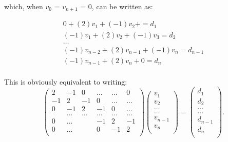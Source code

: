 \documentclass[norsk,a4paper,12pt]{article}
\begin{document}
which, when $v_0$ = $v_{n+1}$ = 0, can be written as:

\begin{equation}
\begin{split}
0 + (2) v_{1} + (-1) v_{2} + = d_1 \\
(-1) v_{1} + (2) v_{2} + (-1) v_{3} = d_2 \\
\dots \\
(-1) v_{n-2} + (2) v_{n-1} + (-1) v_{n} = d_{n-1} \\
(-1) v_{n-1} + (2) v_{n} + 0 = d_{n} \\
\end{split}
\end{equation}
	
This is obviously equivalent to writing:
\begin{equation}
    				\left(\begin{array}{cccccc}
                           2& -1& 0 &\dots   & \dots &0 \\
                           -1 & 2 & -1 &0 &\dots &\dots \\
                           0&-1 &2 & -1 & 0 & \dots \\
                           & \dots   & \dots &\dots   &\dots & \dots \\
                           0&\dots   &  &-1 &2& -1 \\
                           0&\dots    &  & 0  &-1 & 2 \\
                      \end{array} \right)\left(\begin{array}{c}
                           v_1\\
                           v_2\\
                           \dots \\
                           \dots \\
                           v_{n-1} \\
                           v_{n}\\
                      \end{array} \right)
  =\left(\begin{array}{c}
                           d_1\\
                           d_2\\
                           \dots \\
                           \dots \\
                           d_{n-1} \\
                           d_n\\
                      \end{array} \right).	
\end{equation}
\end{document}
